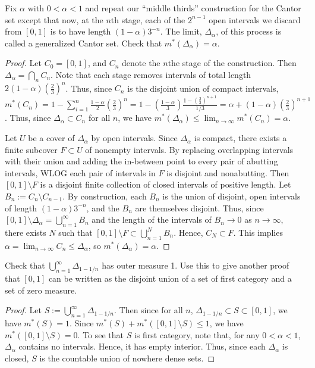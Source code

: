  Fix $\alpha$ with $0 < \alpha < 1$ and repeat our ``middle thirds'' construction for the Cantor set except that now, at the $n$th stage, each of the $2^{n-1}$ open intervals we discard from $[0,1]$ is to have length $(1-\alpha)3^{-n}$. The limit, $\Delta_\alpha$, of this process is called a generalized Cantor set. Check that $m^*(\Delta_\alpha) = \alpha$.
\begin{proof}
Let $C_0 = [0,1]$, and $C_n$ denote the $n$the stage of the construction. Then $\Delta_\alpha = \bigcap_n C_n$.  Note that each stage removes intervals of total length $2 (1-\alpha) (\frac 2 3)^n$.  Thus, since $C_n$ is the disjoint union of compact intervals, $m^*(C_n) = 1  - \sum_{i=1}^n \frac{1-\alpha} 2 (\frac 2 3)^n = 1 - (\frac {1-\alpha} 3) \frac{1 - (\frac 2 3)^{n+1}} {1/3} = \alpha + (1 - \alpha) (\frac 2 3)^{n+1}$. Thus, since $\Delta_\alpha \subset C_n$ for all $n$, we have $m^*(\Delta_\alpha) \leq \lim_{n \rightarrow \infty} m^*(C_n) = \alpha$.


Let $U$ be a cover of $\Delta_\alpha$ by open intervals. Since $\Delta_\alpha$ is compact, there exists a finite subcover $F \subset U$ of nonempty intervals. By replacing overlapping intervals with their union and adding the in-between point to every pair of abutting intervals, WLOG each pair of intervals in $F$ is disjoint and nonabutting. Then $[0,1] \setminus F$ is a disjoint finite collection of closed intervals of positive length. Let $B_n := C_n \setminus C_{n-1}$. By construction, each $B_n$ is the union of disjoint, open intervals of length $(1-\alpha)3^{-n}$, and the $B_n$ are themselves disjoint. Thus, since $[0,1] \setminus \Delta_\alpha = \bigcup_{n=1}^\infty{B_n}$ and the length of the intervals of $B_n \rightarrow 0$ as $n \rightarrow \infty$, there exists $N$ such that $[0,1] \setminus F \subset \bigcup_{n=1}^N{B_n}.$  Hence, $C_N \subset F$. This implies $\alpha = \lim_{n\rightarrow \infty}{C_n} \leq \Delta_\alpha$, so  $m^*(\Delta_\alpha) = \alpha$.
\end{proof}



 Check that $\bigcup_{n=1}^\infty \Delta_{1-1/n}$ has outer measure 1. Use this to give another proof that $[0,1]$ can be written as the disjoint union of a set of first category and a set of zero measure.
\begin{proof}
Let $S := \bigcup_{n=1}^\infty \Delta_{1-1/n}$. Then since for all $n$, $\Delta_{1-1/n} \subset S \subset [0,1]$, we have $m^*(S) = 1$. Since $m^*(S) + m^*([0,1]\setminus S) \leq 1$, we have $m^*([0,1]\setminus S) = 0$.  To see that $S$ is first category, note that, for any $0 < \alpha < 1$, $\Delta_\alpha$ contains no intervals. Hence, it has empty interior. Thus, since each $\Delta_\alpha$ is closed, $S$ is the countable union of nowhere dense sets.

\end{proof}

